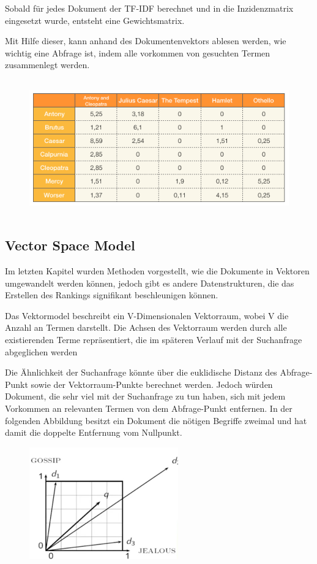 Sobald für jedes Dokument der TF-IDF berechnet und in die Inzidenzmatrix
eingesetzt wurde, entsteht eine Gewichtsmatrix.

Mit Hilfe dieser, kann anhand des Dokumentenvektors ablesen werden, wie
wichtig eine Abfrage ist, indem alle vorkommen von gesuchten Termen
zusammenlegt werden.


\begin{figure}
\centering
\includegraphics[width=13.208cm,height=5.854cm]{bilder/SeminararbeitArkadij-img5.png}
\end{figure}

\subsection[Vector Space Model ]{Vector Space Model }

Im letzten Kapitel wurden Methoden vorgestellt, wie die Dokumente in
Vektoren umgewandelt werden können, jedoch gibt es andere
Datenstrukturen, die das Erstellen des Rankings signifikant
beschleunigen können.

Das Vektormodel beschreibt ein V-Dimensionalen Vektorraum, wobei V die
Anzahl an Termen darstellt. Die Achsen des Vektorraum werden durch alle
existierenden Terme repräsentiert, die im späteren Verlauf mit der
Suchanfrage abgeglichen werden

Die Ähnlichkeit der Suchanfrage könnte über die euklidische Distanz des
Abfrage-Punkt sowie der Vektorraum-Punkte berechnet werden. Jedoch
würden Dokument, die sehr viel mit der Suchanfrage zu tun haben, sich
mit jedem Vorkommen an relevanten Termen von dem Abfrage-Punkt
entfernen. In der folgenden Abbildung besitzt ein Dokument die nötigen
Begriffe zweimal und hat damit die doppelte Entfernung vom Nullpunkt.


\begin{figure}
\centering
\includegraphics[width=6.435cm,height=4.81cm]{bilder/SeminararbeitArkadij-img6.png}
\end{figure}


